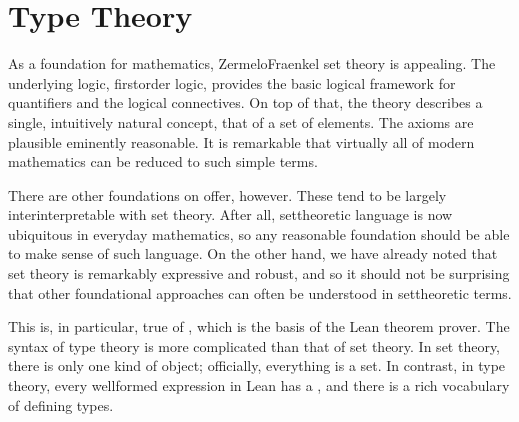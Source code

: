 \documentclass[letterpaper,10pt,english]{sphinxmanual}
\begin{document}
\section{Type Theory}
\label{\detokenize{axiomatic_foundations:type-theory}}
\sphinxAtStartPar
As a foundation for mathematics, Zermelo\sphinxhyphen{}Fraenkel set theory is appealing. The underlying logic, first\sphinxhyphen{}order logic, provides the basic logical framework for quantifiers and the logical connectives. On top of that, the theory describes a single, intuitively natural concept, that of a set of elements. The axioms are plausible eminently reasonable. It is remarkable that virtually all of modern mathematics can be reduced to such simple terms.

\sphinxAtStartPar
There are other foundations on offer, however. These tend to be largely inter\sphinxhyphen{}interpretable with set theory. After all, set\sphinxhyphen{}theoretic language is now ubiquitous in everyday mathematics, so any reasonable foundation should be able to make sense of such language. On the other hand, we have already noted that set theory is remarkably expressive and robust, and so it should not be surprising that other foundational approaches can often be understood in set\sphinxhyphen{}theoretic terms.

\sphinxAtStartPar
This is, in particular, true of , which is the basis of the Lean theorem prover. The syntax of type theory is more complicated than that of set theory. In set theory, there is only one kind of object; officially, everything is a set. In contrast, in type theory, every well\sphinxhyphen{}formed expression in Lean has a , and there is a rich vocabulary of defining types.
\end{document}
